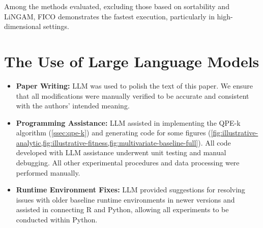 \documentclass{article}
\theoremstyle{plain}
\theoremstyle{definition}
\theoremstyle{remark}
\begin{document}
Among the methods evaluated, excluding those based on sortability and LiNGAM, FICO demonstrates the fastest execution, particularly in high-dimensional settings.%
\newpage
\section*{The Use of Large Language Models}

\begin{itemize}[leftmargin=*]
\itemsep0em
\item\textbf{Paper Writing:} LLM was used to polish the text of this paper. We ensure that all modifications were manually verified to be accurate and consistent with the authors' intended meaning. 
\item\textbf{Programming Assistance:} LLM assisted in implementing the QPE-k algorithm (\cref{ssec:qpe-k}) and generating code for some figures (\cref{fig:illustrative-analytic,fig:illustrative-fitness,fig:multivariate-baseline-full}). All code developed with LLM assistance underwent unit testing and manual debugging. All other experimental procedures and data processing were performed manually.
\item\textbf{Runtime Environment Fixes:} LLM provided suggestions for resolving issues with older baseline runtime environments in newer versions and assisted in connecting R and Python, allowing all experiments to be conducted within Python.
\end{itemize}%
\end{document}
